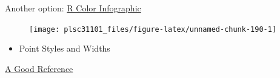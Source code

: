 \documentclass[]{book}
\newenvironment{Shaded}{\begin{snugshade}}{\end{snugshade}}
\newcommand{\KeywordTok}[1]{\textcolor[rgb]{0.13,0.29,0.53}{\textbf{#1}}}
\newcommand{\DataTypeTok}[1]{\textcolor[rgb]{0.13,0.29,0.53}{#1}}
\newcommand{\StringTok}[1]{\textcolor[rgb]{0.31,0.60,0.02}{#1}}
\newcommand{\OperatorTok}[1]{\textcolor[rgb]{0.81,0.36,0.00}{\textbf{#1}}}
\newcommand{\NormalTok}[1]{#1}
\providecommand{\tightlist}{%
  \setlength{\itemsep}{0pt}\setlength{\parskip}{0pt}}
\begin{document}
Another option:
\href{http://research.stowers-institute.org/efg/R/Color/Chart/ColorsChart1.jpg}{R
Color Infographic}

\begin{Shaded}
\end{Shaded}

\begin{figure}

{\centering \texttt{[image: plsc31101\_files/figure-latex/unnamed-chunk-190-1]} 

}

\caption{ }\label{fig:unnamed-chunk-190}
\end{figure}

\begin{itemize}
\tightlist
\item
  Point Styles and Widths
\end{itemize}

\href{http://www.endmemo.com/program/R/pic/pchsymbols.png}{A Good
Reference}
\end{document}
